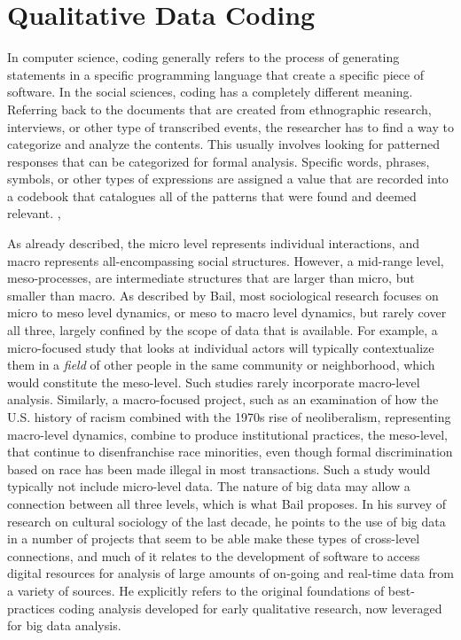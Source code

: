 \documentclass[sigconf]{acmart}
\begin{document}
\section{Qualitative Data Coding}
In computer science, coding generally refers to the process of generating statements in a specific programming language that create a specific piece of software.  In the social sciences, coding has a completely different meaning.  Referring back to the documents that are created from ethnographic research, interviews, or other type of transcribed events, the researcher has to find a way to categorize and analyze the contents.  This usually involves looking for patterned responses that can be categorized for formal analysis.  Specific words, phrases, symbols, or other types of expressions are assigned a value that are recorded into a codebook that catalogues all of the patterns that were found and deemed relevant. \cite{singleton18}, \cite{bryman16}

As already described, the micro level represents individual interactions, and macro represents all-encompassing social structures.  However, a mid-range level, meso-processes, are intermediate structures that are larger than micro, but smaller than macro.  As described by Bail, most sociological research focuses on micro to meso level dynamics, or meso to macro level dynamics, but rarely cover all three, largely confined by the scope of data that is available. \cite{bail14} For example, a micro-focused study that looks at individual actors will typically contextualize them in a {\em field} of other people in the same community or neighborhood, which would constitute the meso-level.  Such studies rarely incorporate macro-level analysis.  Similarly, a macro-focused project, such as an examination of how the U.S. history of racism combined with the 1970s rise of neoliberalism, representing macro-level dynamics, combine to produce institutional practices, the meso-level, that continue to disenfranchise race minorities, even though formal discrimination based on race has been made illegal in most transactions.  Such a study would typically not include micro-level data.  The nature of big data may allow a connection between all three levels, which is what Bail proposes.  In his survey of research on cultural sociology of the last decade, he points to the use of big data in a number of projects that seem to be able make these types of cross-level connections, and much of it relates to the development of software to access digital resources for analysis of large amounts of on-going and real-time data from a variety of sources.  He explicitly refers to the original foundations of best-practices coding analysis developed for early qualitative research, now leveraged for big data analysis. \cite{bail14}
\end{document}
